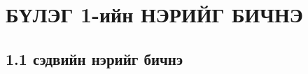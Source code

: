 
\chapter{БҮЛЭГ 1-ийн НЭРИЙГ БИЧНЭ} %
\label{Chapter1} %
\pagecolor{white}

\newcommand{\keyword}[1]{\textbf{#1}}
\newcommand{\tabhead}[1]{\textbf{#1}}
\newcommand{\code}[1]{\texttt{#1}}
\newcommand{\file}[1]{\texttt{\bfseries#1}}
\newcommand{\option}[1]{\texttt{\itshape#1}}


\section{1.1 сэдвийн нэрийг бичнэ}


